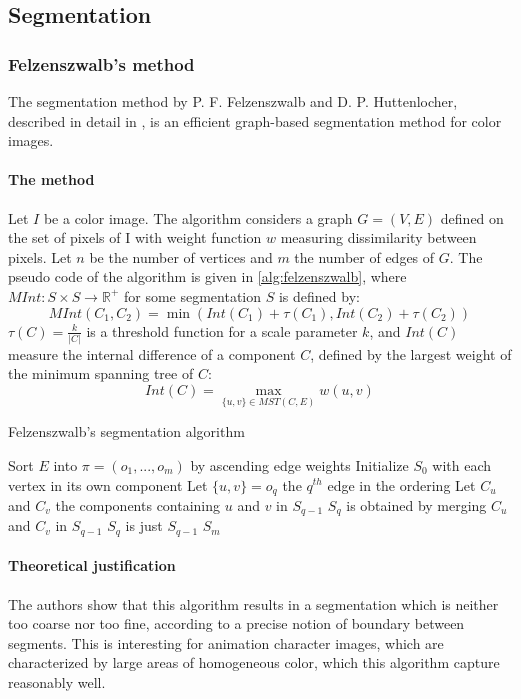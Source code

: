 \subsection{Segmentation}
\subsubsection{Felzenszwalb's method}
The segmentation method by P. F. Felzenszwalb and D. P. Huttenlocher, described in detail in \cite{felzenszwalb2004efficient}, is an efficient graph-based segmentation method for color images.

\paragraph{The method} Let $I$ be a color image. The algorithm considers a graph $G = (V,E)$ defined on the set of pixels of I with weight function $w$ measuring dissimilarity between pixels. Let $n$ be the number of vertices and $m$ the number of edges of $G$. The pseudo code of the algorithm is given in \autoref{alg:felzenszwalb}, where $MInt : S \times S \rightarrow \mathbb{R}^+$ for some segmentation $S$ is defined by:
\[
MInt(C_1, C_2) = \min(Int(C_1) + \tau(C_1), Int(C_2) + \tau(C_2))
\]
$\tau(C) = \frac{k}{|C|}$ is a threshold function for a scale parameter $k$, and $Int(C)$ measure the internal difference of a component $C$, defined by
the largest weight of the minimum spanning tree of $C$:
\[
Int(C) = \max_{\{u,v\} \in MST(C, E)} w(u,v)
\]

\begin{algorithm}
\caption{Felzenszwalb's segmentation algorithm}
\label{alg:felzenszwalb}

\begin{algorithmic}[1]
\State Sort $E$ into $\pi = (o_1, ..., o_m)$ by ascending edge weights
\State Initialize $S_0$ with each vertex in its own component
\State Let $\{u,v\} = o_q$ the $q^{th}$ edge in the ordering
\State Let $C_u$ and $C_v$ the components containing $u$ and $v$ in $S_{q-1}$
\State $S_q$ is obtained by merging $C_u$ and $C_v$ in $S_{q-1}$
\Else
\State $S_q$ is just $S_{q-1}$
\EndIf
\EndFor
\Return $S_m$
\EndFunction
\end{algorithmic}
\end{algorithm}


\paragraph{Theoretical justification} The authors show that this algorithm results in a segmentation which is neither too coarse nor too fine, according to a precise notion of boundary between segments. This is interesting for animation character images, which are characterized by large areas of homogeneous color, which this algorithm capture reasonably well.

